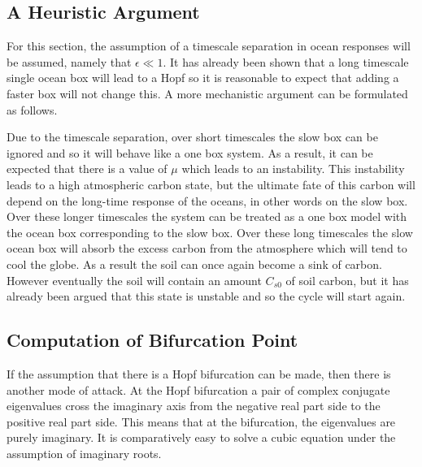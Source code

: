 \subsection{A Heuristic Argument}
For this section, the assumption of a timescale separation in ocean responses will be assumed, namely that $\epsilon \ll 1$. It has already been shown that a long timescale
single ocean box will lead to a Hopf so it is reasonable to expect that adding a faster box will not change this. A more mechanistic argument can be formulated as follows.

Due to the timescale
separation, over short timescales the slow box can be ignored and so it will behave like a one box system. As a result, it can be expected that there
is a value of $\mu$ which leads to an instability. This instability leads to a high atmospheric carbon state, but the ultimate fate of this carbon will depend on the long-time response of the oceans, in other
words on the slow box. Over these longer timescales the system can be treated as a one box model with the ocean box corresponding to the slow box.
Over these long timescales the slow ocean box will absorb the excess carbon from the atmosphere which will tend to cool the globe. As a result
the soil can once again become a sink of carbon. However eventually the soil will contain an amount $C_{s0}$ of soil carbon, but it has already been argued that this state is unstable
and so the cycle will start again.

\subsection{Computation of Bifurcation Point}
If the assumption that there is a Hopf bifurcation can be made, then there is another mode of attack. At the Hopf bifurcation a pair of complex conjugate eigenvalues
cross the imaginary axis from the negative real part side to the positive real part side. This means that at the bifurcation, the eigenvalues are purely imaginary. It is
comparatively easy to solve a cubic equation under the assumption of imaginary roots.

